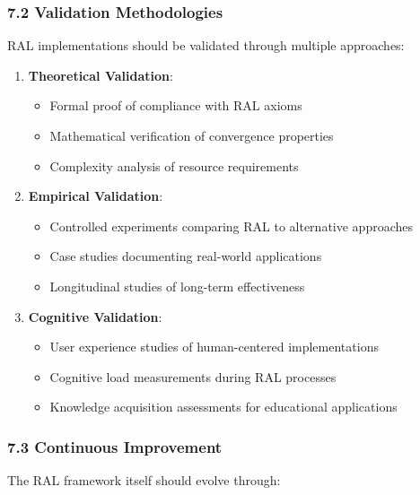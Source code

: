 \documentclass[
]{article}
\providecommand{\tightlist}{%
  \setlength{\itemsep}{0pt}\setlength{\parskip}{0pt}}
\begin{document}
\subsubsection{7.2 Validation
Methodologies}\label{validation-methodologies}

RAL implementations should be validated through multiple approaches:

\begin{enumerate}
\def\labelenumi{\arabic{enumi}.}
\tightlist
\item
  \textbf{Theoretical Validation}:

  \begin{itemize}
  \tightlist
  \item
    Formal proof of compliance with RAL axioms
  \item
    Mathematical verification of convergence properties
  \item
    Complexity analysis of resource requirements
  \end{itemize}
\item
  \textbf{Empirical Validation}:

  \begin{itemize}
  \tightlist
  \item
    Controlled experiments comparing RAL to alternative approaches
  \item
    Case studies documenting real-world applications
  \item
    Longitudinal studies of long-term effectiveness
  \end{itemize}
\item
  \textbf{Cognitive Validation}:

  \begin{itemize}
  \tightlist
  \item
    User experience studies of human-centered implementations
  \item
    Cognitive load measurements during RAL processes
  \item
    Knowledge acquisition assessments for educational applications
  \end{itemize}
\end{enumerate}

\subsubsection{7.3 Continuous Improvement}\label{continuous-improvement}

The RAL framework itself should evolve through:
\end{document}
